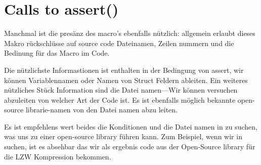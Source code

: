 \section{Calls to assert()}

Manchmal ist die presänz des  macro's ebenfalls nützlich:
allgemein erlaubt dieses Makro rückschlüsse auf source code Dateinamen,
Zeilen nummern und die Bedinung für das Macro im Code.


Die nützlichste Informastionen ist enthalten in der Bedingung von assert, wir können Variablennamen oder Namen
von Struct Feldern ableiten. Ein weiteres nützliches Stück Information sind die Datei namen---Wir können versuchen
abzuleiten von welcher Art der Code ist. 
Es ist ebenfalls möglich bekannte open-source librarie-namen von den Datei namen abzu leiten.




Es ist empfehlens wert beides die Konditionen und die Datei namen in  zu suchen, was uns zu einer open-source library führen kann.
Zum Beispiel, wenn wir  in  suchen, ist es absehbar das wir als ergebnis code aus der 
Open-Source library für die LZW Kompression bekommen. %


